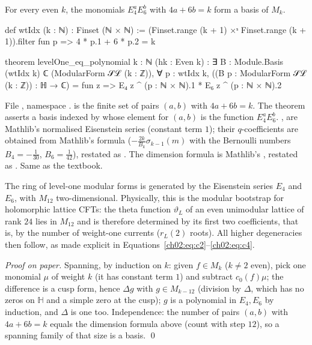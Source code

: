 \begin{theorem}[{$M_*=\C[E_4,E_6]$; Ebeling, Cor.~2.2}]\label{ch02:thm:polynomial}
For every even $k$, the monomials $E_4^aE_6^b$ with $4a+6b=k$ form a basis of $M_k$.
\end{theorem}
\begin{leancode}
def wtIdx (k : ℕ) : Finset (ℕ × ℕ) :=
  (Finset.range (k + 1) ×ˢ Finset.range (k + 1)).filter fun p => 4 * p.1 + 6 * p.2 = k

theorem levelOne_eq_polynomial {k : ℕ} (hk : Even k) :
    ∃ B : Module.Basis (wtIdx k) ℂ (ModularForm 𝒮ℒ (k : ℤ)),
      ∀ p : wtIdx k, ((B p : ModularForm 𝒮ℒ (k : ℤ)) : ℍ → ℂ)
        = fun z => E₄ z ^ (p : ℕ × ℕ).1 * E₆ z ^ (p : ℕ × ℕ).2
\end{leancode}
\begin{dictionary}
File , namespace .   is the
finite set of pairs $(a,b)$ with $4a+6b=k$.  The theorem asserts a basis indexed by 
whose element for $(a,b)$ is the function $E_4^aE_6^b$.  ,  are Mathlib's
normalised Eisenstein series (constant term $1$); their $q$-coefficients are obtained from
Mathlib's formula  ($-\tfrac{2k}{B_k}\sigma_{k-1}(m)$ with
the Bernoulli numbers $B_4=-\tfrac1{30}$, $B_6=\tfrac1{42}$), restated as
.  The dimension formula is Mathlib's
, restated as .  Same as
the textbook.
\end{dictionary}
\begin{physics}
The ring of level-one modular forms is generated by the Eisenstein series $E_4$ and $E_6$, with $M_{12}$ two-dimensional. Physically, this is the modular bootstrap for holomorphic lattice CFTs: the theta function $\vartheta_L$ of an even unimodular lattice of rank $24$ lies in $M_{12}$ and is therefore determined by its first two coefficients, that is, by the number of weight-one currents ($r_L(2)$ roots). All higher degeneracies then follow, as made explicit in Equations~\eqref{ch02:eq:c2}--\eqref{ch02:eq:c4}.
\end{physics}
\emph{Proof on paper.}  Spanning, by induction on $k$: given $f\in M_k$ ($k\ne2$ even), pick one
monomial $\mu$ of weight $k$ (it has constant term $1$) and subtract $c_0(f)\mu$; the difference
is a cusp form, hence $\Delta g$ with $g\in M_{k-12}$ (division by $\Delta$, which has no zeros on
$\mathbb{H}$ and a simple zero at the cusp); $g$ is a polynomial in $E_4,E_6$ by induction, and
$\Delta$ is one too.  Independence: the number of pairs $(a,b)$ with $4a+6b=k$ equals the
dimension formula above (count with step $12$), so a spanning family of that size is a basis.
\qed

